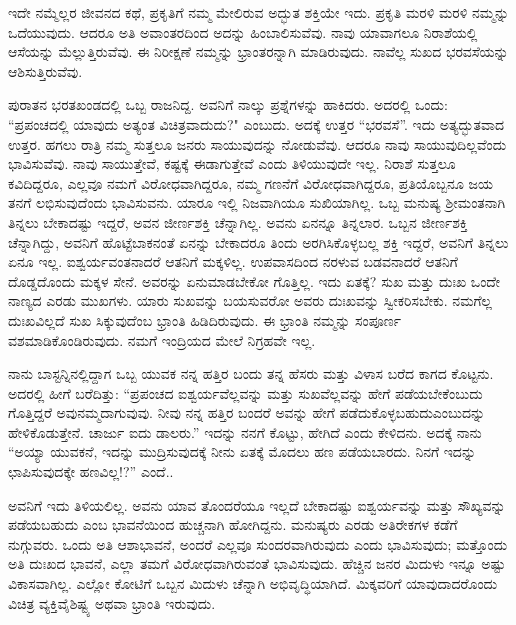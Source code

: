 ಇದೇ ನಮ್ಮೆಲ್ಲರ ಜೀವನದ ಕಥೆ, ಪ್ರಕೃತಿಗೆ ನಮ್ಮ ಮೇಲಿರುವ ಅದ್ಭುತ ಶಕ್ತಿಯೇ ಇದು. ಪ್ರಕೃತಿ ಮರಳಿ ಮರಳಿ ನಮ್ಮನ್ನು ಒದೆಯುವುದು. ಆದರೂ ಅತಿ ಅವಾಂತರದಿಂದ ಅದನ್ನು ಹಿಂಬಾಲಿಸುವೆವು. ನಾವು ಯಾವಾಗಲೂ ನಿರಾಶೆಯಲ್ಲಿ ಆಸೆಯನ್ನು ಮೆಲ್ಲುತ್ತಿರುವೆವು. ಈ ನಿರೀಕ್ಷಣೆ ನಮ್ಮನ್ನು ಭ್ರಾಂತರನ್ನಾಗಿ ಮಾಡಿರುವುದು. ನಾವೆಲ್ಲ ಸುಖದ ಭರವಸೆಯನ್ನು ಆಶಿಸುತ್ತಿರುವೆವು.

ಪುರಾತನ ಭರತಖಂಡದಲ್ಲಿ ಒಬ್ಬ ರಾಜನಿದ್ದ. ಅವನಿಗೆ ನಾಲ್ಕು ಪ್ರಶ್ನೆಗಳನ್ನು ಹಾಕಿದರು. ಅದರಲ್ಲಿ ಒಂದು: “ಪ್ರಪಂಚದಲ್ಲಿ ಯಾವುದು ಅತ್ಯಂತ ವಿಚಿತ್ರವಾದುದು?" ಎಂಬುದು. ಅದಕ್ಕೆ ಉತ್ತರ “ಭರವಸೆ”. ಇದು ಅತ್ಯದ್ಭುತವಾದ ಉತ್ತರ. ಹಗಲು ರಾತ್ರಿ ನಮ್ಮ ಸುತ್ತಲೂ ಜನರು ಸಾಯುವುದನ್ನು ನೋಡುವೆವು. ಆದರೂ ನಾವು ಸಾಯುವುದಿಲ್ಲವೆಂದು ಭಾವಿಸುವೆವು. ನಾವು ಸಾಯುತ್ತೇವೆ, ಕಷ್ಟಕ್ಕೆ ಈಡಾಗುತ್ತೇವೆ ಎಂದು ತಿಳಿಯುವುದೇ ಇಲ್ಲ. ನಿರಾಶೆ ಸುತ್ತಲೂ ಕವಿದಿದ್ದರೂ, ಎಲ್ಲವೂ ನಮಗೆ ವಿರೋಧವಾಗಿದ್ದರೂ, ನಮ್ಮ ಗಣನೆಗೆ ವಿರೋಧವಾಗಿದ್ದರೂ, ಪ್ರತಿಯೊಬ್ಬನೂ ಜಯ ತನಗೆ ಲಭಿಸುವುದೆಂದು ಭಾವಿಸುವನು. ಯಾರೂ ಇಲ್ಲಿ ನಿಜವಾಗಿಯೂ ಸುಖಿಯಾಗಿಲ್ಲ. ಒಬ್ಬ ಮನುಷ್ಯ ಶ‍್ರೀಮಂತನಾಗಿ ತಿನ್ನಲು ಬೇಕಾದಷ್ಟು ಇದ್ದರೆ, ಅವನ ಜೀರ್ಣಶಕ್ತಿ ಚೆನ್ನಾಗಿಲ್ಲ. ಅವನು ಏನನ್ನೂ ತಿನ್ನಲಾರ. ಒಬ್ಬನ ಜೀರ್ಣಶಕ್ತಿ ಚೆನ್ನಾಗಿದ್ದು, ಅವನಿಗೆ ಹೊಟ್ಟೆಬಾಕನಂತೆ ಏನನ್ನು ಬೇಕಾದರೂ ತಿಂದು ಅರಗಿಸಿಕೊಳ್ಳಬಲ್ಲ ಶಕ್ತಿ ಇದ್ದರೆ, ಅವನಿಗೆ ತಿನ್ನಲು ಏನೂ ಇಲ್ಲ. ಐಶ್ವರ್ಯವಂತನಾದರೆ ಆತನಿಗೆ ಮಕ್ಕಳಿಲ್ಲ. ಉಪವಾಸದಿಂದ ನರಳುವ ಬಡವನಾದರೆ ಆತನಿಗೆ ದೊಡ್ಡದೊಂದು ಮಕ್ಕಳ ಸೇನೆ. ಅವರನ್ನು ಏನುಮಾಡಬೇಕೋ ಗೊತ್ತಿಲ್ಲ. ಇದು ಏತಕ್ಕೆ? ಸುಖ ಮತ್ತು ದುಃಖ ಒಂದೇ ನಾಣ್ಯದ ಎರಡು ಮುಖಗಳು. ಯಾರು ಸುಖವನ್ನು ಬಯಸುವರೋ ಅವರು ದುಃಖವನ್ನು ಸ್ವೀಕರಿಸಬೇಕು. ನಮಗೆಲ್ಲ ದುಃಖವಿಲ್ಲದೆ ಸುಖ ಸಿಕ್ಕುವುದೆಂಬ ಭ್ರಾಂತಿ ಹಿಡಿದಿರುವುದು. ಈ ಭ್ರಾಂತಿ ನಮ್ಮನ್ನು ಸಂಪೂರ್ಣ ವಶಮಾಡಿಕೊಂಡಿರುವುದು. ನಮಗೆ ಇಂದ್ರಿಯದ ಮೇಲೆ ನಿಗ್ರಹವೇ ಇಲ್ಲ.

ನಾನು ಬಾಸ್ಟನ್ನಿನಲ್ಲಿದ್ದಾಗ ಒಬ್ಬ ಯುವಕ ನನ್ನ ಹತ್ತಿರ ಬಂದು ತನ್ನ ಹೆಸರು ಮತ್ತು ವಿಳಾಸ ಬರೆದ ಕಾಗದ ಕೊಟ್ಟನು. ಅದರಲ್ಲಿ ಹೀಗೆ ಬರೆದಿತ್ತು: “ಪ್ರಪಂಚದ ಐಶ್ವರ್ಯವೆಲ್ಲವನ್ನು ಮತ್ತು ಸುಖವೆಲ್ಲವನ್ನು ಹೇಗೆ ಪಡೆಯಬೇಕೆಂಬುದು ಗೊತ್ತಿದ್ದರೆ ಅವು\break ನಮ್ಮದಾಗುವುವು. ನೀವು ನನ್ನ ಹತ್ತಿರ ಬಂದರೆ ಅವನ್ನು ಹೇಗೆ ಪಡೆದುಕೊಳ್ಳಬಹುದು\break ಎಂಬುದನ್ನು ಹೇಳಿಕೊಡುತ್ತೇನೆ. ಚಾರ್ಜು ಐದು ಡಾಲರು.” ಇದನ್ನು ನನಗೆ ಕೊಟ್ಟು, ಹೇಗಿದೆ ಎಂದು ಕೇಳಿದನು. ಅದಕ್ಕೆ ನಾನು “ಅಯ್ಯಾ ಯುವಕನೆ, ಇದನ್ನು ಮುದ್ರಿಸುವುದಕ್ಕೆ ನೀನು ಏತಕ್ಕೆ ಮೊದಲು ಹಣ ಪಡೆಯಬಾರದು. ನಿನಗೆ ಇದನ್ನು ಛಾಪಿಸುವುದಕ್ಕೇ ಹಣವಿಲ್ಲ!?” ಎಂದೆ..

\newpage

ಅವನಿಗೆ ಇದು ತಿಳಿಯಲಿಲ್ಲ. ಅವನು ಯಾವ ತೊಂದರೆಯೂ ಇಲ್ಲದೆ ಬೇಕಾದಷ್ಟು ಐಶ್ವರ್ಯವನ್ನು ಮತ್ತು ಸೌಖ್ಯವನ್ನು ಪಡೆಯಬಹುದು ಎಂಬ ಭಾವನೆಯಿಂದ ಹುಚ್ಚನಾಗಿ ಹೋಗಿದ್ದನು. ಮನುಷ್ಯರು ಎರಡು ಅತಿರೇಕಗಳ ಕಡೆಗೆ ನುಗ್ಗುವರು. ಒಂದು ಅತಿ ಆಶಾಭಾವನೆ, ಅಂದರೆ ಎಲ್ಲವೂ ಸುಂದರವಾಗಿರುವುದು ಎಂದು ಭಾವಿಸುವುದು; ಮತ್ತೊಂದು ಅತಿ ದುಃಖದ ಭಾವನೆ, ಎಲ್ಲಾ ತಮಗೆ ವಿರೋಧವಾಗಿರುವಂತೆ ಭಾವಿಸುವುದು. ಹೆಚ್ಚಿನ ಜನರ ಮಿದುಳು ಇನ್ನೂ ಅಷ್ಟು ವಿಕಾಸವಾಗಿಲ್ಲ. ಎಲ್ಲೋ ಕೋಟಿಗೆ ಒಬ್ಬನ ಮಿದುಳು ಚೆನ್ನಾಗಿ ಅಭಿವೃದ್ಧಿಯಾಗಿದೆ. ಮಿಕ್ಕವರಿಗೆ ಯಾವುದಾದರೊಂದು ವಿಚಿತ್ರ ವ್ಯಕ್ತಿವೈಶಿಷ್ಟ್ಯ ಅಥವಾ ಭ್ರಾಂತಿ ಇರುವುದು.

